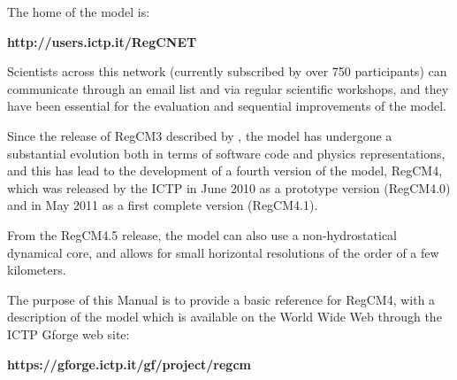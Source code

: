 The home of the model is:

\begin{center}
{\bf http://users.ictp.it/RegCNET}
\end{center}

Scientists across this network (currently subscribed by over 750 participants)
can communicate through an email list and via regular scientific workshops,
and they have been essential for the evaluation and sequential improvements of
the model.

Since the release of \ac{RegCM}3 described by \cite{Pal_07}, the model has undergone
a substantial evolution both in terms of software code and physics
representations, and this has lead to the development of a fourth version of
the model, \ac{RegCM}4, which was released by the ICTP in June 2010 as a prototype
version (\ac{RegCM}4.0) and in May 2011 as a first complete version (\ac{RegCM}4.1).

From the \ac{RegCM}4.5 release, the model can also use a non-hydrostatical
dynamical core, and allows for small horizontal resolutions of the order of
a few kilometers.

The purpose of this Manual is to provide a basic reference for \ac{RegCM}4, with
a description of the model which is available on the World Wide Web through
the ICTP Gforge web site:

\begin{center}
  {\bf https://gforge.ictp.it/gf/project/regcm }
\end{center}
